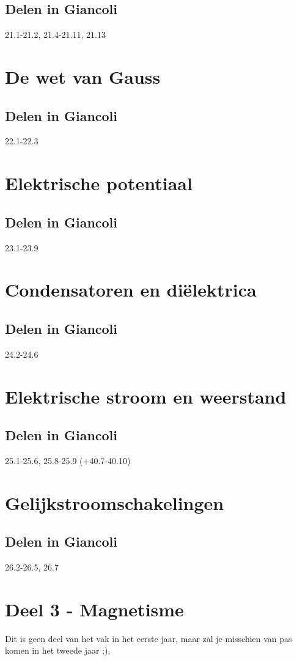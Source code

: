 \documentclass[12pt,a4paper]{article}
\begin{document}
    \subsection{Delen in Giancoli}
    21.1-21.2, 21.4-21.11, 21.13


    \section{De wet van Gauss}

    \subsection{Delen in Giancoli}
    22.1-22.3


    \section{Elektrische potentiaal}

    \subsection{Delen in Giancoli}
    23.1-23.9


    \section{Condensatoren en diëlektrica}

    \subsection{Delen in Giancoli}
    24.2-24.6


    \section{Elektrische stroom en weerstand}

    \subsection{Delen in Giancoli}
    25.1-25.6, 25.8-25.9 (+40.7-40.10)


    \section{Gelijkstroomschakelingen}

    \subsection{Delen in Giancoli}
    26.2-26.5, 26.7
    \newpage


    \section{Deel 3 - Magnetisme}
    Dit is geen deel van het vak in het eerste jaar, maar zal je misschien van pas komen in het tweede jaar ;).
\end{document}

